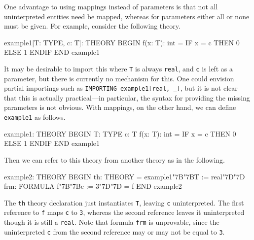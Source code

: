 \documentclass[11pt,twoside,openright,titlepage]{cslreport}
\def\mapb{\char"7B\char"7B}
\def\mape{\char"7D\char"7D}
\begin{document}

One advantage to using mappings instead of parameters is that not all
uninterpreted entities need be mapped, whereas for parameters either all
or none must be given.  For example, consider the following theory.
\begin{session}
example1[T: TYPE, c: T]: THEORY
 BEGIN
  f(x: T): int = IF x = c THEN 0 ELSE 1 ENDIF
 END example1
\end{session}
\noindent It may be desirable to import this where \texttt{T} is always
\texttt{real}, and \texttt{c} is left as a parameter, but there is
currently no mechanism for this.  One could envision partial importings
such as \texttt{IMPORTING example1[real, \_]}, but it is not clear that
this is actually practical---in particular, the syntax for providing the
missing parameters is not obvious.  With mappings, on the other hand, we
can define \texttt{example1} as follows.
\begin{session}
example1: THEORY
 BEGIN
  T: TYPE
  c: T
  f(x: T): int = IF x = c THEN 0 ELSE 1 ENDIF
 END example1
\end{session}
\noindent Then we can refer to this theory from another theory as in the
following.
\begin{session}
example2: THEORY
 BEGIN
  th: THEORY = example1\mapb{}T := real\mape{}
  frm: FORMULA f\mapb{}c := 3\mape{} = f
 END example2
\end{session}
\noindent The \texttt{th} theory declaration just instantiates \texttt{T},
leaving \texttt{c} uninterpreted.  The first reference to \texttt{f} maps
\texttt{c} to \texttt{3}, whereas the second reference leaves it
uninterpreted though it is still a \texttt{real}.  Note that formula
\texttt{frm} is unprovable, since the uninterpreted \texttt{c} from the
second reference may or may not be equal to \texttt{3}.
\end{document}
